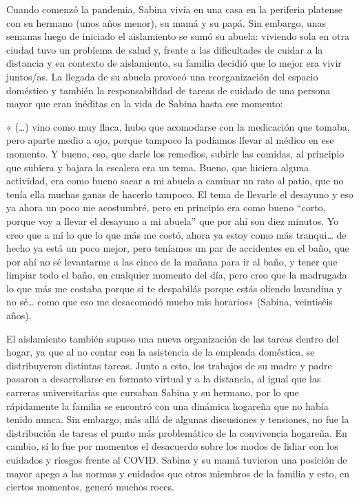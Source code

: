 \begin{refsection}
Cuando comenzó la pandemia, Sabina vivía en una casa en la periferia platense con su hermano (unos años menor), su mamá y su papá. Sin embargo, unas semanas luego de iniciado el aislamiento se sumó su abuela: viviendo sola en otra ciudad tuvo un problema de salud y, frente a las dificultades de cuidar a la distancia y en contexto de aislamiento, su familia decidió que lo mejor era vivir juntos/as. La llegada de su abuela provocó una reorganización del espacio doméstico y también la responsabilidad de tareas de cuidado de una persona mayor que eran inéditas en la vida de Sabina hasta ese momento:


\begin{gbcita}
« (…) vino como muy flaca, hubo que acomodarse con la medicación que tomaba, pero aparte medio a ojo, porque tampoco la podíamos llevar al médico en ese momento. Y bueno, eso, que darle los remedios, subirle las comidas, al principio que subiera y bajara la escalera era un tema. Bueno, que hiciera alguna actividad, era como bueno sacar a mi abuela a caminar un rato al patio, que no tenía ella muchas ganas de hacerlo tampoco. El tema de llevarle el desayuno y eso ya ahora un poco me acostumbré, pero en principio era como bueno “corto, porque voy a llevar el desayuno a mi abuela” que por ahí son diez minutos. Yo creo que a mí lo que lo que más me costó, ahora ya estoy como más tranqui… de hecho ya está un poco mejor, pero teníamos un par de accidentes en el baño, que por ahí no sé levantarme a las cinco de la mañana para ir al baño, y tener que limpiar todo el baño, en cualquier momento del día, pero creo que la madrugada lo que más me costaba porque si te despabilás porque estás oliendo lavandina y no sé… como que eso me desacomodó mucho mis horarios» (Sabina, veintiséis años).

\end{gbcita}

El aislamiento también supuso una nueva organización de las tareas dentro del hogar, ya que al no contar con la asistencia de la empleada doméstica, se distribuyeron distintas tareas. Junto a esto, los trabajos de su madre y padre pasaron a desarrollarse en formato virtual y a la distancia, al igual que las carreras universitarias que cursaban Sabina y su hermano, por lo que rápidamente la familia se encontró con una dinámica hogareña que no había tenido nunca. Sin embargo, más allá de algunas discusiones y tensiones, no fue la distribución de tareas el punto más problemático de la convivencia hogareña. En cambio, sí lo fue por momentos el desacuerdo sobre los modos de lidiar con los cuidados y riesgos frente al COVID. Sabina y su mamá tuvieron una posición de mayor apego a las normas y cuidados que otros miembros de la familia y esto, en ciertos momentos, generó muchos roces.


\end{refsection}
